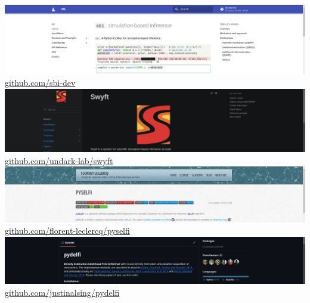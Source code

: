 \documentclass[aspectratio=169]{beamer}
\begin{document}
\begin{frame}
\begin{columns}
        \includegraphics[width=\textwidth]{figures/sbi_screenshot}
        \href{https://github.com/sbi-dev}{github.com/sbi-dev}
        \includegraphics[width=\textwidth]{figures/swyft_screenshot}
        \href{https://github.com/undark-lab/swyft}{github.com/undark-lab/swyft}
        \includegraphics[width=\textwidth]{figures/selfi_screenshot}
        \href{https://github.com/florent-leclercq/pyselfi}{github.com/florent-leclercq/pyselfi}
        \includegraphics[width=\textwidth]{figures/delfi_screenshot}
        \href{https://github.com/justinalsing/pydelfi}{github.com/justinalsing/pydelfi}



    \end{columns}
\end{frame}
\end{document}
